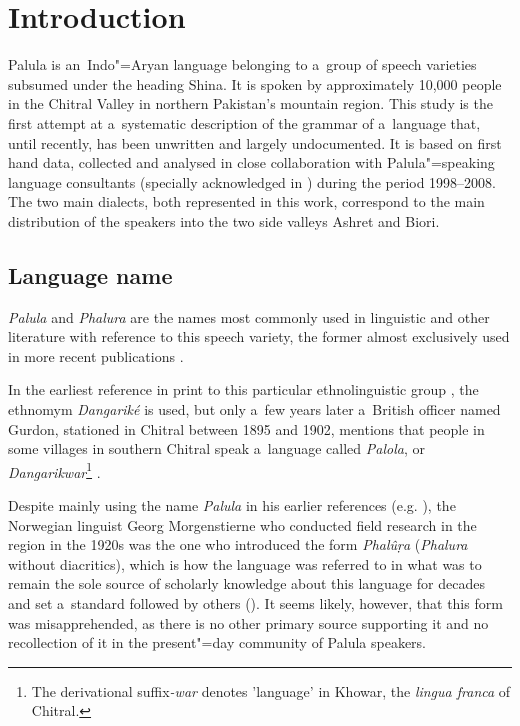 \chapter{Introduction}
\label{chap:1}

Palula is an~Indo"=Aryan language belonging to a~group of speech varieties subsumed under the heading
Shina. It is spoken by approximately 10,000 people in the Chitral Valley in northern Pakistan's
mountain region. This study is the first attempt at a~systematic description of the grammar of
a~language that, until recently, has been unwritten and largely undocumented. It is based on first
hand data, collected and analysed in close collaboration with Palula"=speaking language consultants
(specially acknowledged in ) during the period 1998--2008. The two main
dialects, both represented in this work, correspond to the main distribution of the speakers into
the two side valleys Ashret and Biori.

\section{Language name}
\label{sec:1-1}

\textit{Palula} and \textit{Phalura} are the names most commonly used in linguistic and other
literature with reference to this speech variety, the former almost exclusively used in more recent
publications \citep{cacopardo2001,bashir2003,schmidtkohistani2008,heegardpetersen2006}. 

In the earliest reference in print to this particular ethnolinguistic group
\citep[64]{biddulph1986}, the ethnomym \textit{Dangariké} is used, but only a~few years later
a~British officer named Gurdon, stationed in Chitral between 1895 and 1902, mentions that people in
some villages in southern Chitral speak a~language called \textit{Palola}, or
\textit{Dangarikwar}\footnote{The derivational suffix\textit{-war} denotes 'language' in Khowar, the
  \textit{lingua franca} of Chitral.} \citep{morgenstierne1941}.


Despite mainly using the name \textit{Palula} in his earlier references
(e.g. \citeyear[54]{morgenstierne1932}), the Norwegian linguist Georg Morgenstierne who conducted
field research in the region in the 1920s was the one who introduced the form \textit{Phalûṛa}
(\textit{Phalura} without diacritics), which is how the language was referred to in what was to
remain the sole source of scholarly knowledge about this language for decades
\citep{morgenstierne1941} and set a~standard followed by others
(\citealt{buddruss1967,edelman1983,masica1991,decker1992a}). It seems likely,
however, that this form was misapprehended, as there is no other primary source supporting it and no
recollection of it in the present"=day community of Palula speakers.


